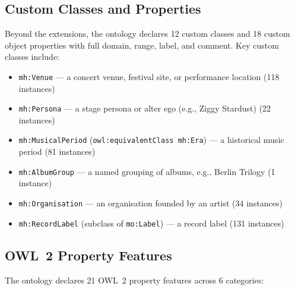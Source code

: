 \subsection{Custom Classes and Properties}

Beyond the extensions, the ontology declares 12 custom classes and 18 custom object properties with full domain, range, label, and comment. Key custom classes include:

\begin{itemize}[nosep]
  \item \texttt{mh:Venue} --- a concert venue, festival site, or performance location (118 instances)
  \item \texttt{mh:Persona} --- a stage persona or alter ego (e.g., Ziggy Stardust) (22 instances)
  \item \texttt{mh:MusicalPeriod} (\texttt{owl:equivalentClass mh:Era}) --- a historical music period (81 instances)
  \item \texttt{mh:AlbumGroup} --- a named grouping of albums, e.g., Berlin Trilogy (1 instance)
  \item \texttt{mh:Organisation} --- an organisation founded by an artist (34 instances)
  \item \texttt{mh:RecordLabel} (subclass of \texttt{mo:Label}) --- a record label (131 instances)
\end{itemize}

\subsection{OWL~2 Property Features}

The ontology declares 21 OWL~2 property features across 6 categories:

